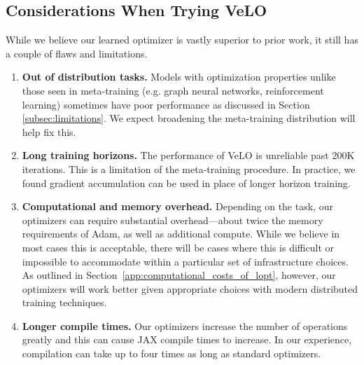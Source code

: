 \documentclass[11pt]{article}
\begin{document}
\subsection{Considerations When Trying VeLO}
While we believe our learned optimizer is vastly superior to prior work, it still has a couple of flaws and limitations.
\begin{enumerate}
    \item \textbf{Out of distribution tasks.} Models with optimization properties unlike those seen in meta-training (e.g. graph neural networks, reinforcement learning) sometimes have poor performance as discussed in Section \ref{subsec:limitations}. We expect broadening the meta-training distribution will help fix this.
    \item \textbf{Long training horizons.} The performance of VeLO is unreliable past 200K iterations. This is a limitation of the meta-training procedure. In practice, we found gradient accumulation can be used in place of longer horizon training.
    \item \textbf{Computational and memory overhead.} Depending on the task, our optimizers can require substantial overhead---about twice the memory requirements of Adam, as well as additional compute.
    While we believe in most cases this is acceptable, there will be cases where this is difficult or impossible to accommodate within a particular set of infrastructure choices. As outlined in Section~\ref{app:computational_costs_of_lopt}, however, our optimizers will work better given appropriate choices with modern distributed training techniques.
    \item \textbf{Longer compile times.} Our optimizers increase the number of operations greatly and this can cause JAX compile times to increase. In our experience, compilation can take up to four times as long as standard optimizers.
\end{enumerate}
\end{document}
